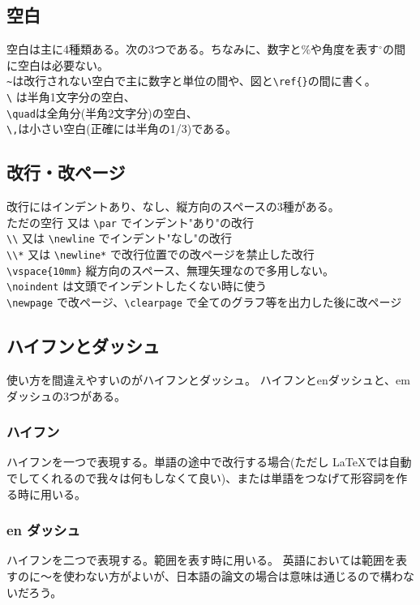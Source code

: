 \documentclass[a4j]{jsarticle}
\begin{document}
\subsection{空白}
空白は主に4種類ある。次の3つである。ちなみに、数字と\%や角度を表す$^\circ$の間に空白は必要ない。\\
\verb|~|は改行されない空白で主に数字と単位の間や、図と\verb|\ref{}|の間に書く。\\
\verb|\| は半角1文字分の空白、\\
\verb|\quad|は全角分(半角2文字分)の空白、\\
\verb|\,|は小さい空白(正確には半角の1/3)である。
\subsection{改行・改ページ}
改行にはインデントあり、なし、縦方向のスペースの3種がある。\\
ただの空行 又は \verb|\par| でインデント"あり"の改行\\
\verb|\\| 又は \verb|\newline| でインデント"なし"の改行\\
\verb|\\*| 又は \verb|\newline*| で改行位置での改ページを禁止した改行\\
\verb|\vspace{10mm}|	縦方向のスペース、無理矢理なので多用しない。\\
\verb|\noindent| は文頭でインデントしたくない時に使う\\
\verb|\newpage| で改ページ、\verb|\clearpage| で全てのグラフ等を出力した後に改ページ
\subsection{ハイフンとダッシュ}
使い方を間違えやすいのがハイフンとダッシュ。
ハイフンとenダッシュと、emダッシュの3つがある。

\subsubsection{ハイフン}
ハイフンを一つで表現する。単語の途中で改行する場合(ただし \LaTeX  では自動でしてくれるので我々は何もしなくて良い)、または単語をつなげて形容詞を作る時に用いる。

\subsubsection{en ダッシュ}
ハイフンを二つで表現する。範囲を表す時に用いる。
英語においては範囲を表すのに～を使わない方がよいが、日本語の論文の場合は意味は通じるので構わないだろう。
\end{document}
